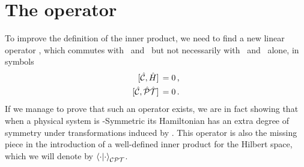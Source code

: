     \section{The \texorpdfstring{\hC}{C} operator}
        To improve the definition of the inner product, we need to find a new linear operator \hC, which commutes with \hH\ and \hPT\ but not necessarily with \hP\ and \hT\ alone, in symbols
        \begin{align}
            \label{eq:C-H-commutator}
            \comm*{\hC}{\hH} &= 0
            \mycomma
            \\
            \label{eq:C-PT-commutator}
            \comm*{\hC}{\hPT} &= 0
            \myperiod
        \end{align}
        If we manage to prove that such an operator exists, we are in fact showing that when a physical system is \hPT-Symmetric its Hamiltonian has an extra degree of symmetry under transformations induced by \hC. This operator is also the missing piece in the introduction of a well-defined inner product for the Hilbert space, which we will denote by $\braket{\cdot}{\cdot}_{\mathcal{C}\mathcal{P}\mathcal{T}}$.

